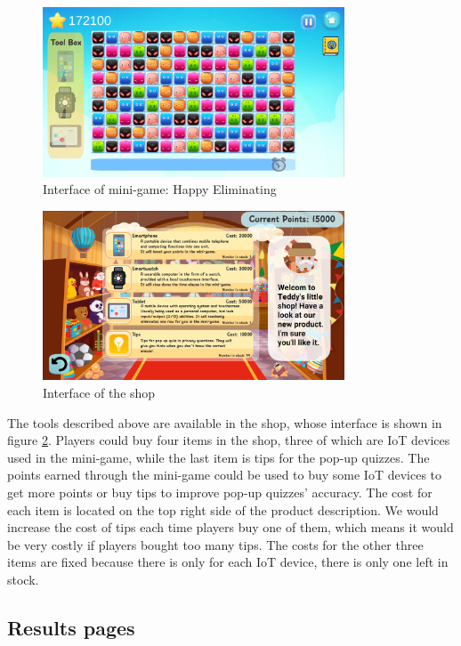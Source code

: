 \documentclass[msc,deptreport,ai]{infthesis}      %
\begin{document}
\begin{figure}
    \centering
    \includegraphics[width=0.8\textwidth]{Mini-game.png}
    \caption{Interface of mini-game: Happy Eliminating}
    \label{fig:game}
\end{figure}

\begin{figure}
    \centering
    \includegraphics[width=0.8\textwidth]{Shop.png}
    \caption{Interface of the shop}
    \label{fig:shop}
\end{figure}

The tools described above are available in the shop, whose interface is shown in figure \ref{fig:shop}. Players could buy four items in the shop, three of which are IoT devices used in the mini-game, while the last item is tips for the pop-up quizzes. The points earned through the mini-game could be used to buy some IoT devices to get more points or buy tips to improve pop-up quizzes' accuracy. The cost for each item is located on the top right side of the product description. We would increase the cost of tips each time players buy one of them, which means it would be very costly if players bought too many tips. The costs for the other three items are fixed because there is only for each IoT device, there is only one left in stock.

\subsection{Results pages}
\end{document}
